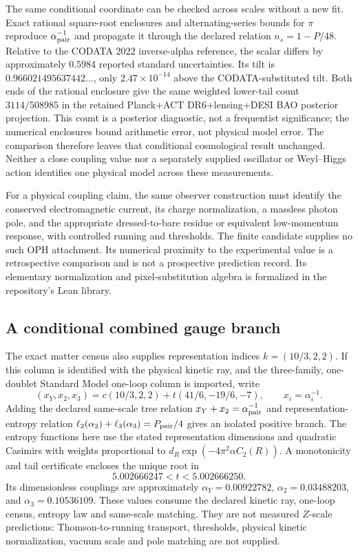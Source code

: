 The same conditional coordinate can be checked across scales without a new
fit. Exact rational square-root enclosures and alternating-series bounds
for $\pi$ reproduce $\alpha_{\rm pair}^{-1}$ and propagate it through the
declared relation $n_s=1-P/48$. Relative to the CODATA 2022 inverse-alpha
reference, the scalar differs by approximately $0.5984$ reported standard
uncertainties. Its tilt is $0.966021495637442\ldots$, only
$2.47\times10^{-14}$ above the CODATA-substituted tilt. Both ends of the
rational enclosure give the same weighted lower-tail count $3114/508985$
in the retained Planck+ACT DR6+lensing+DESI BAO posterior projection.
This count is a posterior diagnostic, not a frequentist significance;
the numerical enclosures bound arithmetic error, not physical model error.
The comparison therefore leaves that conditional cosmological result
unchanged. Neither a
close coupling value nor a separately supplied oscillator or Weyl--Higgs
action identifies one physical model across these measurements.

For a physical coupling claim, the same observer construction must identify
the conserved electromagnetic current, its charge normalization, a massless
photon pole, and the appropriate dressed-to-bare residue or equivalent
low-momentum response, with controlled running and thresholds. The finite
candidate supplies no such OPH attachment. Its numerical proximity to the
experimental value is a retrospective comparison and is not a prospective
prediction record. Its elementary normalization and pixel-substitution
algebra is formalized in the repository's Lean library.

\subsection{A conditional combined gauge branch}

The exact matter census also supplies representation indices
\(k=(10/3,2,2)\). If this column is identified with the physical kinetic ray,
and the three-family, one-doublet Standard Model one-loop column is
imported, write
\[
 (x_Y,x_2,x_3)=c(10/3,2,2)+t(41/6,-19/6,-7),\qquad
 x_i=\alpha_i^{-1}.
\]
Adding the declared same-scale tree relation
\(x_Y+x_2=\alpha_{\rm pair}^{-1}\) and representation-entropy relation
\(\ell_2(\alpha_2)+\ell_3(\alpha_3)=P_{\rm pair}/4\) gives an isolated
positive branch. The entropy functions here use the stated representation
dimensions and quadratic Casimirs with weights proportional to
\(d_R\exp(-4\pi^2\alpha C_2(R))\). A monotonicity and tail certificate
encloses the unique root in
\[
 5.002666247<t<5.002666250.
\]
Its dimensionless couplings are approximately
\(\alpha_Y=0.00922782\), \(\alpha_2=0.03488203\), and
\(\alpha_3=0.10536109\). These values consume the declared kinetic ray,
one-loop census, entropy law and same-scale matching. They are not measured
\(Z\)-scale predictions: Thomson-to-running transport, thresholds, physical
kinetic normalization, vacuum scale and pole matching are not supplied.
